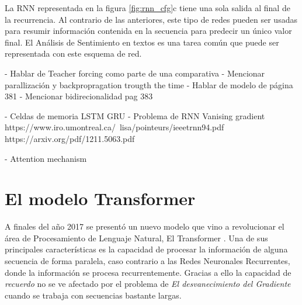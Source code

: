 La RNN representada en la figura \ref{fig:rnn_cfg}c tiene una sola salida al final de la
recurrencia. Al contrario de las anteriores, este tipo de redes pueden ser usadas para resumir
información contenida en la secuencia para predecir un único valor final. El Análisis de Sentimiento
en textos es una tarea común que puede ser representada con este esquema de red.

- Hablar de Teacher forcing como parte de una comparativa
    - Mencionar parallización y backpropragation trougth the time
- Hablar de modelo de página 381
- Mencionar bidirecionalidad pag 383

- Celdas de memoria LSTM GRU
- Problema de RNN
Vanising gradient
https://www.iro.umontreal.ca/~lisa/pointeurs/ieeetrnn94.pdf
https://arxiv.org/pdf/1211.5063.pdf

- Attention mechanism



\section{El modelo Transformer}

A finales del año 2017 se presentó un nuevo modelo que vino a revolucionar el área de Procesamiento
de Lenguaje Natural, El Transformer \cite{Vaswani}. Una de sus principales características es la
capacidad de procesar la información de alguna secuencia de forma paralela, caso contrario a las
Redes Neuronales Recurrentes, donde la información se procesa recurrentemente. Gracias a ello
la capacidad de \textit{recuerdo} no se ve afectado por el problema de \textit{El
desvanecimiento del Gradiente} cuando se trabaja con secuencias bastante largas.
